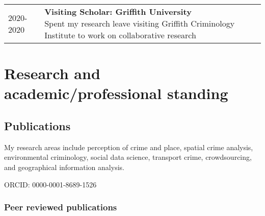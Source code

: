 \documentclass[10pt,a4paper,]{article}
\makeatletter
\newcounter{papers}
\def\briefitem#1#2#3{
#2 & \parbox[t]{0.85\textwidth}{%
      \textbf{#1}\\[-0.1cm]{\footnotesize #3}}\\[0.4cm]}
\def\briefsection#1{\begin{longtable}{@{\extracolsep{\fill}}ll}#1\end{longtable}}
\makeatother
\begin{document}
\briefsection{\briefitem{Visiting Scholar: Griffith University}{2020-2020}{Spent my research leave visiting Griffith Criminology Institute to work on collaborative research}\briefitem{Visiting Scholar: Queensland University of Technology}{2020-2020}{Spent my research leave visiting QUT Centre for Justice to work on collaborative research}\briefitem{Carpentries Instructor: The Carpentries Global}{2020-present}{Achieved certification as instructor for Data Carpentry}\briefitem{Fellow: Higher Education Academy}{2019-present}{Fellowship awarded to professionals who meet the criteria of Descriptor 2 of the UK Professional Standards Framework for teaching and supporting learning in higher education.}\briefitem{Fellow: Software Sustainability Institute}{2017-present}{Working to promote open research and credit for research software}\briefitem{Board member: Economic and Social Research Council Business and Local Government Data Research Centre}{2017-present}{Data Acquisition Board}\briefitem{Honorary Lecturer: University College London}{2016-present}{Research and teaching activities based in Department of Civil, Environmental, and Geomatic Engineering}}

\hypertarget{research-and-academicprofessional-standing}{%
\section{Research and academic/professional standing}\label{research-and-academicprofessional-standing}}

\hypertarget{publications}{%
\subsection{Publications}\label{publications}}

My research areas include perception of crime and place, spatial crime analysis, environmental criminology, social data science, transport crime, crowdsourcing, and geographical information analysis.

ORCID: 0000-0001-8689-1526

\hypertarget{peer-reviewed-publications}{%
\subsubsection{Peer reviewed publications}\label{peer-reviewed-publications}}

\newrefcontext[sorting=none]\setcounter{papers}{0}\pagebreak[3]
\printbibliography[category=bib-/Users/reka/Dropbox (The University of Manchester)/statistically_insignificant/public/cv/published.bib-1912650,heading=none]\setcounter{papers}{0}
\end{document}
